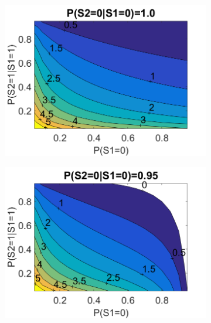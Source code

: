 \documentclass{edm_template}
\begin{document}
		\begin{figure}[!ht]\small
			\centering
			\begin{subfigure}[t]{0.32\linewidth}
				\centering
				\includegraphics[width=1.05\linewidth]{figures/contour1.png}
				\caption{\label{fig:contour1}}
			\end{subfigure}
			\begin{subfigure}[t]{0.32\linewidth}
				\centering
				\includegraphics[width=1.05\linewidth]{figures/contour2.png}
				\caption{\label{fig:contour2}}
			\end{subfigure}
			\begin{subfigure}[t]{0.32\linewidth}
				\centering

\end{subfigure}
\end{figure}
\end{document}
